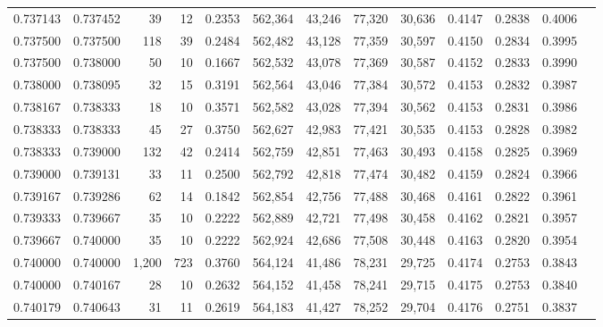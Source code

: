 \begin{tabular}{rrrrrrrrrrrrr}
0.737143 & 0.737452 &    39 &  12 &                                     0.2353 & 562,364 &  43,246 &  77,320 &  30,636 & 0.4147 & 0.2838 & 0.4006 \\
0.737500 & 0.737500 &   118 &  39 &                                     0.2484 & 562,482 &  43,128 &  77,359 &  30,597 & 0.4150 & 0.2834 & 0.3995 \\
0.737500 & 0.738000 &    50 &  10 &                                     0.1667 & 562,532 &  43,078 &  77,369 &  30,587 & 0.4152 & 0.2833 & 0.3990 \\
0.738000 & 0.738095 &    32 &  15 &                                     0.3191 & 562,564 &  43,046 &  77,384 &  30,572 & 0.4153 & 0.2832 & 0.3987 \\
0.738167 & 0.738333 &    18 &  10 &                                     0.3571 & 562,582 &  43,028 &  77,394 &  30,562 & 0.4153 & 0.2831 & 0.3986 \\
0.738333 & 0.738333 &    45 &  27 &                                     0.3750 & 562,627 &  42,983 &  77,421 &  30,535 & 0.4153 & 0.2828 & 0.3982 \\
0.738333 & 0.739000 &   132 &  42 &                                     0.2414 & 562,759 &  42,851 &  77,463 &  30,493 & 0.4158 & 0.2825 & 0.3969 \\
0.739000 & 0.739131 &    33 &  11 &                                     0.2500 & 562,792 &  42,818 &  77,474 &  30,482 & 0.4159 & 0.2824 & 0.3966 \\
0.739167 & 0.739286 &    62 &  14 &                                     0.1842 & 562,854 &  42,756 &  77,488 &  30,468 & 0.4161 & 0.2822 & 0.3961 \\
0.739333 & 0.739667 &    35 &  10 &                                     0.2222 & 562,889 &  42,721 &  77,498 &  30,458 & 0.4162 & 0.2821 & 0.3957 \\
0.739667 & 0.740000 &    35 &  10 &                                     0.2222 & 562,924 &  42,686 &  77,508 &  30,448 & 0.4163 & 0.2820 & 0.3954 \\
0.740000 & 0.740000 & 1,200 & 723 &                                     0.3760 & 564,124 &  41,486 &  78,231 &  29,725 & 0.4174 & 0.2753 & 0.3843 \\
0.740000 & 0.740167 &    28 &  10 &                                     0.2632 & 564,152 &  41,458 &  78,241 &  29,715 & 0.4175 & 0.2753 & 0.3840 \\
0.740179 & 0.740643 &    31 &  11 &                                     0.2619 & 564,183 &  41,427 &  78,252 &  29,704 & 0.4176 & 0.2751 & 0.3837 \\

\end{tabular}
